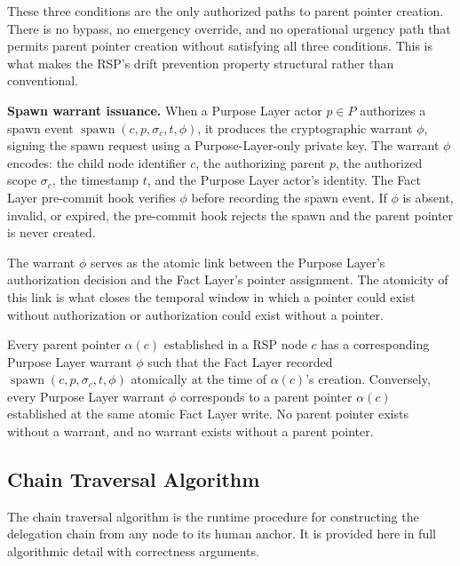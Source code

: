 These three conditions are the only authorized paths to parent pointer creation. There is no bypass, no emergency override, and no operational urgency path that permits parent pointer creation without satisfying all three conditions. This is what makes the RSP's drift prevention property structural rather than conventional.

\medskip
\noindent\textbf{Spawn warrant issuance.} When a Purpose Layer actor $p \in P$ authorizes a spawn event $\operatorname{spawn}(c, p, \sigma_c, t, \phi)$, it produces the cryptographic warrant $\phi$, signing the spawn request using a Purpose-Layer-only private key. The warrant $\phi$ encodes: the child node identifier $c$, the authorizing parent $p$, the authorized scope $\sigma_c$, the timestamp $t$, and the Purpose Layer actor's identity. The Fact Layer pre-commit hook verifies $\phi$ before recording the spawn event. If $\phi$ is absent, invalid, or expired, the pre-commit hook rejects the spawn and the parent pointer is never created.

The warrant $\phi$ serves as the atomic link between the Purpose Layer's authorization decision and the Fact Layer's pointer assignment. The atomicity of this link is what closes the temporal window in which a pointer could exist without authorization or authorization could exist without a pointer.

\begin{prop}
\label{prop:spawn-auth-completeness}
Every parent pointer $\alpha(c)$ established in a RSP node $c$ has a corresponding Purpose Layer warrant $\phi$ such that the Fact Layer recorded $\operatorname{spawn}(c, p, \sigma_c, t, \phi)$ atomically at the time of $\alpha(c)$'s creation. Conversely, every Purpose Layer warrant $\phi$ corresponds to a parent pointer $\alpha(c)$ established at the same atomic Fact Layer write. No parent pointer exists without a warrant, and no warrant exists without a parent pointer.
\end{prop}

\subsection{Chain Traversal Algorithm}
\label{sec:chain-traversal-algorithm}

The chain traversal algorithm is the runtime procedure for constructing the delegation chain from any node to its human anchor. It is provided here in full algorithmic detail with correctness arguments.

